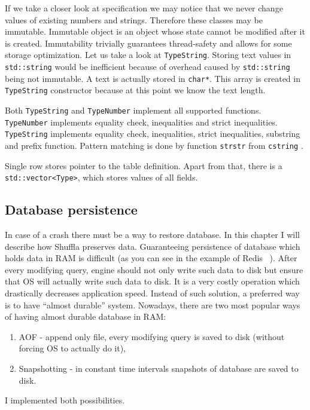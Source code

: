 \documentclass[10pt,a4paper]{article}
\begin{document}
If we take a closer look at specification we may notice that we never change values of existing numbers and strings. Therefore these classes may be immutable. Immutable object is an object whose state cannot be modified after it is created. Immutability trivially guarantees thread-safety and allows for some storage optimization. Let us take a look at \verb|TypeString|. Storing text values in \verb|std::string| would be inefficient because of overhead caused by \verb|std::string| being not immutable. A text is actually stored in \verb|char*|. This array is created in \verb|TypeString| constructor because at this point we know the text length.   

Both \verb|TypeString| and \verb|TypeNumber| implement all supported functions. \verb|TypeNumber| implements equality check, inequalities and strict inequalities. \verb|TypeString| implements equality check, inequalities, strict inequalities, substring and prefix function. Pattern matching is done by function \verb|strstr| from \verb|cstring| \cite{STRSTR}.

Single row stores pointer to the table definition. Apart from that, there is a \verb|std::vector<Type>|, which stores values of all fields.

\subsection{Database persistence}

In case of a crash there must be a way to restore database. In this chapter I will describe how Shuffla preserves data. Guaranteeing persistence of database which holds data in RAM is difficult (as you can see in the example of Redis ~\cite{REDPE}). After every modifying query, engine should not only write such data to disk but ensure that OS will actually write such data to disk. It is a very costly operation which drastically decreases application speed. Instead of such solution, a preferred way is to have “almost durable” system.
Nowadays, there are two most popular ways of having almost durable database in RAM:

\begin{enumerate}
\item AOF - append only file, every modifying query is saved to disk (without forcing OS to actually do it),
\item Snapshotting - in constant time intervals snapshots of database are saved to disk.
\end{enumerate}
I implemented both possibilities. 
\end{document}
